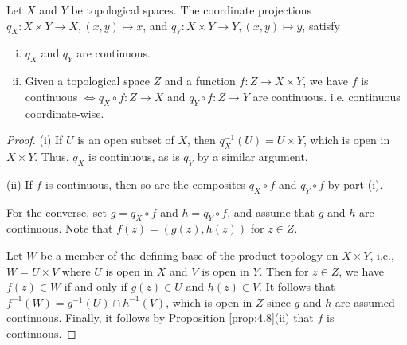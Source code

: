 \documentclass[a4paper]{article}
\begin{document}
\begin{proposition}\label{prop:4.9}
    Let $X$ and $Y$ be topological spaces. The coordinate projections $q_{X}: X \times Y \rightarrow X,(x, y) \mapsto x$, and $q_{Y}: X \times Y \rightarrow Y,(x, y) \mapsto y$, satisfy

    \begin{enumerate}[(i)]
        \item $q_{X}$ and $q_{Y}$ are continuous.

        \item Given a topological space $Z$ and a function $f: Z \rightarrow X \times Y$, we have $f$ is continuous $\Longleftrightarrow q_{X} \circ f: Z \rightarrow X$ and $q_{Y} \circ f: Z \rightarrow Y$ are continuous. i.e. continuous coordinate-wise. 
    \end{enumerate}
\end{proposition}
\begin{proof}
    (i) If $U$ is an open subset of $X$, then $q_{X}^{-1}(U)=U \times Y$, which is open in $X \times Y$. Thus, $q_{X}$ is continuous, as is $q_{Y}$ by a similar argument.

    (ii) If $f$ is continuous, then so are the composites $q_X \circ f$ and $q_{Y} \circ f$ by part (i). 
    
    For the converse, set $g=q_{X} \circ f$ and $h=q_{Y} \circ f$, and assume that $g$ and $h$ are continuous. Note that $f(z)=(g(z), h(z))$ for $z \in Z$. 
    
    Let $W$ be a member of the defining base of the product topology on $X \times Y$, i.e., $W=U \times V$ where $U$ is open in $X$ and $V$ is open in $Y$. Then for $z \in Z$, we have $f(z) \in W$ if and only if $g(z) \in U$ and $h(z) \in V$. It follows that $f^{-1}(W)=g^{-1}(U) \cap h^{-1}(V)$, which is open in $Z$ since $g$ and $h$ are assumed continuous. Finally, it follows by Proposition \ref{prop:4.8}(ii) that $f$ is continuous.
\end{proof}
\end{document}
